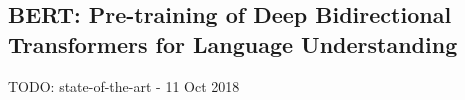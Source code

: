 
\subsection{BERT: Pre-training of Deep Bidirectional Transformers for Language Understanding}

TODO: state-of-the-art - 11 Oct 2018